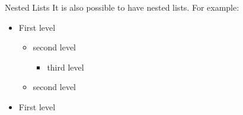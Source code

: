 \begin{frame}[fragile]{Nested Lists}
It is also possible to have nested lists. For example:

\begin{itemize}[label=\textbullet]
\item First level
\begin{itemize}
\item second level
\begin{itemize}
\item third level
\end{itemize}
\item second level
\end{itemize}
\item First level
\end{itemize}

\end{frame}
